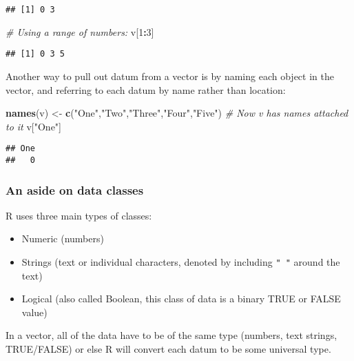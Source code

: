 \documentclass[]{article}
\newenvironment{Shaded}{\begin{snugshade}}{\end{snugshade}}
\newcommand{\KeywordTok}[1]{\textcolor[rgb]{0.13,0.29,0.53}{\textbf{#1}}}
\newcommand{\DecValTok}[1]{\textcolor[rgb]{0.00,0.00,0.81}{#1}}
\newcommand{\StringTok}[1]{\textcolor[rgb]{0.31,0.60,0.02}{#1}}
\newcommand{\CommentTok}[1]{\textcolor[rgb]{0.56,0.35,0.01}{\textit{#1}}}
\newcommand{\OperatorTok}[1]{\textcolor[rgb]{0.81,0.36,0.00}{\textbf{#1}}}
\newcommand{\NormalTok}[1]{#1}
\providecommand{\tightlist}{%
  \setlength{\itemsep}{0pt}\setlength{\parskip}{0pt}}
\begin{document}
\begin{verbatim}
## [1] 0 3
\end{verbatim}

\begin{Shaded}
\begin{Highlighting}[]
\CommentTok{# Using a range of numbers:}
\NormalTok{v[}\DecValTok{1}\OperatorTok{:}\DecValTok{3}\NormalTok{]}
\end{Highlighting}
\end{Shaded}

\begin{verbatim}
## [1] 0 3 5
\end{verbatim}

Another way to pull out datum from a vector is by naming each object in
the vector, and referring to each datum by name rather than location:

\begin{Shaded}
\begin{Highlighting}[]
\KeywordTok{names}\NormalTok{(v) <-}\StringTok{ }\KeywordTok{c}\NormalTok{(}\StringTok{"One"}\NormalTok{,}\StringTok{"Two"}\NormalTok{,}\StringTok{"Three"}\NormalTok{,}\StringTok{"Four"}\NormalTok{,}\StringTok{"Five"}\NormalTok{)}
\CommentTok{# Now v has names attached to it}
\NormalTok{v[}\StringTok{"One"}\NormalTok{]}
\end{Highlighting}
\end{Shaded}

\begin{verbatim}
## One 
##   0
\end{verbatim}

\subsubsection{An aside on data classes}\label{an-aside-on-data-classes}

R uses three main types of classes:

\begin{itemize}
\tightlist
\item
  Numeric (numbers)
\item
  Strings (text or individual characters, denoted by including
  \texttt{"\ "} around the text)
\item
  Logical (also called Boolean, this class of data is a binary TRUE or
  FALSE value)
\end{itemize}

In a vector, all of the data have to be of the same type (numbers, text
strings, TRUE/FALSE) or else R will convert each datum to be some
universal type.
\end{document}
